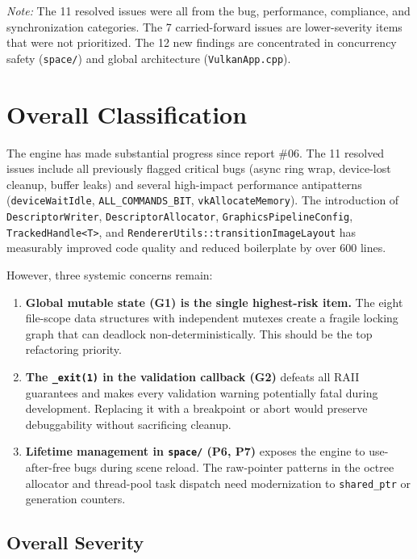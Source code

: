 \documentclass[a4paper,12pt]{article}
\begin{document}
\textit{Note:} The 11 resolved issues were all from the bug, performance,
compliance, and synchronization categories. The 7 carried-forward issues are
lower-severity items that were not prioritized. The 12 new findings are
concentrated in concurrency safety (\texttt{space/}) and global architecture
(\texttt{VulkanApp.cpp}).

\newpage

\section{Overall Classification}

The engine has made substantial progress since report \#06. The 11 resolved
issues include all previously flagged critical bugs (async ring wrap, device-lost
cleanup, buffer leaks) and several high-impact performance antipatterns
(\texttt{deviceWaitIdle}, \texttt{ALL\_COMMANDS\_BIT}, \texttt{vkAllocateMemory}).
The introduction of \texttt{DescriptorWriter}, \texttt{DescriptorAllocator},
\texttt{GraphicsPipelineConfig}, \texttt{TrackedHandle<T>}, and
\texttt{RendererUtils::transitionImageLayout} has measurably improved code
quality and reduced boilerplate by over 600 lines.

However, three systemic concerns remain:

\begin{enumerate}
  \item \textbf{Global mutable state (G1) is the single highest-risk item.}
        The eight file-scope data structures with independent mutexes create
        a fragile locking graph that can deadlock non-deterministically.
        This should be the top refactoring priority.
  \item \textbf{The \texttt{\_exit(1)} in the validation callback (G2)}
        defeats all RAII guarantees and makes every validation warning
        potentially fatal during development. Replacing it with a
        breakpoint or abort would preserve debuggability without
        sacrificing cleanup.
  \item \textbf{Lifetime management in \texttt{space/} (P6, P7)} exposes the
        engine to use-after-free bugs during scene reload. The raw-pointer
        patterns in the octree allocator and thread-pool task dispatch need
        modernization to \texttt{shared\_ptr} or generation counters.
\end{enumerate}

\subsection*{Overall Severity}
\end{document}
